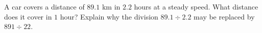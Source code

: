 A car covers a distance of $89.1$ km in $2.2$ hours at a steady speed. What distance does it cover in $1$ hour? Explain why the division $89.1\div2.2$ may be replaced by $891\div22$.
